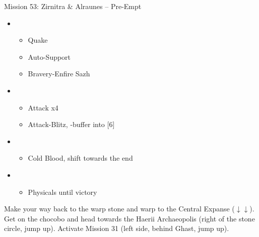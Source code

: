 \begin{battle}{Mission 53: Zirnitra \& Alraunes -- Pre-Empt}
	\begin{itemize}
		\item \third
			\begin{itemize}
				\item Quake
				\item Auto-Support
				\item Bravery-Enfire Sazh
			\end{itemize}
		\item \first
			\begin{itemize}
				\item Attack x4
				\item Attack-Blitz, \rav-buffer into [6]
			\end{itemize}
		\item \fifth
			\begin{itemize}
				\item Cold Blood, shift towards the end
			\end{itemize}
		\item \fourth
			\begin{itemize}
				\item Physicals until victory
			\end{itemize}
	\end{itemize}
\end{battle}

Make your way back to the warp stone and warp to the Central Expanse ($\downarrow\downarrow$).
Get on the chocobo and head towards the Haerii Archaeopolis (right of the stone circle, jump up).
Activate Mission 31 (left side, behind Ghast, jump up).

